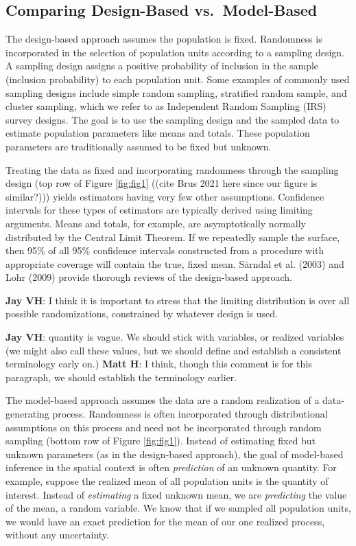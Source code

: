 \documentclass[]{elsarticle} %
\begin{document}
\hypertarget{comparing-design-based-vs.-model-based}{%
\subsection{Comparing Design-Based
vs.~Model-Based}\label{comparing-design-based-vs.-model-based}}

The design-based approach assumes the population is fixed. Randomness is
incorporated in the selection of population units according to a
sampling design. A sampling design assigns a positive probability of
inclusion in the sample (inclusion probability) to each population unit.
Some examples of commonly used sampling designs include simple random
sampling, stratified random sample, and cluster sampling, which we refer
to as Independent Random Sampling (IRS) survey designs. The goal is to
use the sampling design and the sampled data to estimate population
parameters like means and totals. These population parameters are
traditionally assumed to be fixed but unknown.

Treating the data as fixed and incorporating randomness through the
sampling design (top row of Figure \ref{fig:fig1} ((cite Brus 2021 here
since our figure is similar?))) yields estimators having very few other
assumptions. Confidence intervals for these types of estimators are
typically derived using limiting arguments. Means and totals, for
example, are asymptotically normally distributed by the Central Limit
Theorem. If we repeatedly sample the surface, then 95\% of all 95\%
confidence intervals constructed from a procedure with appropriate
coverage will contain the true, fixed mean. Särndal et al. (2003) and
Lohr (2009) provide thorough reviews of the design-based approach.

\textbf{Jay VH}: I think it is important to stress that the limiting
distribution is over all possible randomizations, constrained by
whatever design is used.

\textbf{Jay VH}: quantity is vague. We should stick with variables, or
realized variables (we might also call these values, but we should
define and establish a consistent terminology early on.) \textbf{Matt
H}: I think, though this comment is for this paragraph, we should
establish the terminology earlier.

The model-based approach assumes the data are a random realization of a
data-generating process. Randomness is often incorporated through
distributional assumptions on this process and need not be incorporated
through random sampling (bottom row of Figure \ref{fig:fig1}). Instead
of estimating fixed but unknown parameters (as in the design-based
approach), the goal of model-based inference in the spatial context is
often \emph{prediction} of an unknown quantity. For example, suppose the
realized mean of all population units is the quantity of interest.
Instead of \emph{estimating} a fixed unknown mean, we are
\emph{predicting} the value of the mean, a random variable. We know that
if we sampled all population units, we would have an exact prediction
for the mean of our one realized process, without any uncertainty.
\end{document}
